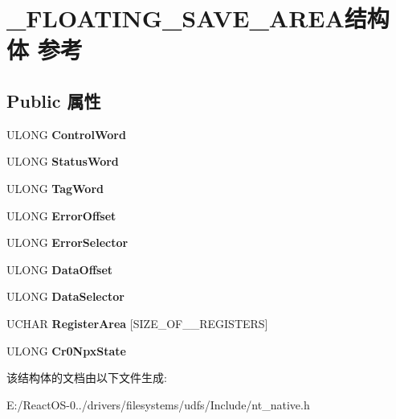 \hypertarget{struct___f_l_o_a_t_i_n_g___s_a_v_e___a_r_e_a}{}\section{\+\_\+\+F\+L\+O\+A\+T\+I\+N\+G\+\_\+\+S\+A\+V\+E\+\_\+\+A\+R\+E\+A结构体 参考}
\label{struct___f_l_o_a_t_i_n_g___s_a_v_e___a_r_e_a}
\subsection*{Public 属性}
\begin{DoxyCompactItemize}
\item 
\mbox{\label{struct___f_l_o_a_t_i_n_g___s_a_v_e___a_r_e_a_a9bad377810891aba7366495949f74cb3}} 
U\+L\+O\+NG {\bfseries Control\+Word}
\item 
\mbox{\label{struct___f_l_o_a_t_i_n_g___s_a_v_e___a_r_e_a_a7bce3d104295e2872709ba630bf87a9e}} 
U\+L\+O\+NG {\bfseries Status\+Word}
\item 
\mbox{\label{struct___f_l_o_a_t_i_n_g___s_a_v_e___a_r_e_a_adb3eaf42e5575a85d1776c4f6f9226f0}} 
U\+L\+O\+NG {\bfseries Tag\+Word}
\item 
\mbox{\label{struct___f_l_o_a_t_i_n_g___s_a_v_e___a_r_e_a_adb31dd1594f5f1913ec1bf00b22fa495}} 
U\+L\+O\+NG {\bfseries Error\+Offset}
\item 
\mbox{\label{struct___f_l_o_a_t_i_n_g___s_a_v_e___a_r_e_a_a39fc27f4a0fc2812d2003881f735af58}} 
U\+L\+O\+NG {\bfseries Error\+Selector}
\item 
\mbox{\label{struct___f_l_o_a_t_i_n_g___s_a_v_e___a_r_e_a_aec55a645ebd2071a910b3d8155a67676}} 
U\+L\+O\+NG {\bfseries Data\+Offset}
\item 
\mbox{\label{struct___f_l_o_a_t_i_n_g___s_a_v_e___a_r_e_a_abd82803a2026951f8904fdfa1704dfa7}} 
U\+L\+O\+NG {\bfseries Data\+Selector}
\item 
\mbox{\label{struct___f_l_o_a_t_i_n_g___s_a_v_e___a_r_e_a_aa5276bb1458d204cc0620194ce9ca334}} 
U\+C\+H\+AR {\bfseries Register\+Area} \mbox{[}S\+I\+Z\+E\+\_\+\+O\+F\+\_\+\_\+\+R\+E\+G\+I\+S\+T\+E\+RS\mbox{]}
\item 
\mbox{\label{struct___f_l_o_a_t_i_n_g___s_a_v_e___a_r_e_a_a73486e307858473fb9f73c055c850b2d}} 
U\+L\+O\+NG {\bfseries Cr0\+Npx\+State}
\end{DoxyCompactItemize}


该结构体的文档由以下文件生成\+:\begin{DoxyCompactItemize}
\item 
E\+:/\+React\+O\+S-\/0../drivers/filesystems/udfs/\+Include/nt\+\_\+native.\+h\end{DoxyCompactItemize}
